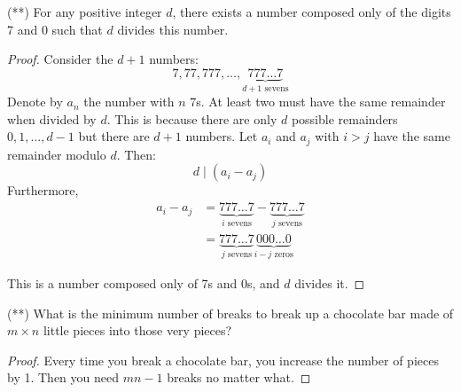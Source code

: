 \documentclass[12pt]{article}
\begin{document}
\begin{problem}
(**) For any positive integer $d$, there exists a number composed only of the digits 7 and 0 such that $d$ divides this number.

\begin{proof}
Consider the $d+1$ numbers:
\[
7, 77, 777, \ldots, \underbrace{777\ldots7}_{d+1 \text{ sevens}}
\]
Denote by $a_n$ the number with $n$ $7$s. At least two must have the same remainder when divided by $d$. This is because there are only $d$ possible remainders $0,1,\ldots,d-1$ but there are $d+1$ numbers.  Let $a_i$ and $a_j$ with $i > j$ have the same remainder modulo $d$. Then:
\[
d \mid (a_i - a_j)
\]
Furthermore,
\begin{align*}
a_i - a_j &= \underbrace{777\ldots7}_{i \text{ sevens}} - \underbrace{777\ldots7}_{j \text{ sevens}} \\
&= \underbrace{777\ldots7}_{j \text{ sevens}}\underbrace{000\ldots0}_{i-j \text{ zeros}}
\end{align*}

This is a number composed only of 7s and 0s, and $d$ divides it.
\end{proof}

\end{problem}

\begin{problem}
(**) What is the minimum number of breaks to break up a chocolate bar made of $m \times n$ little pieces into those very pieces?

\begin{proof}
Every time you break a chocolate bar, you increase the number of pieces by 1. Then you need $mn -1$ breaks no matter what.
\end{proof}
\end{problem}
\end{document}
